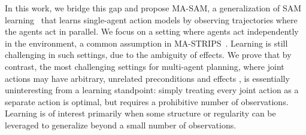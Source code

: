 \documentclass[letterpaper]{article} %
\theoremstyle{definition}
\theoremstyle{remark}
\newcommand{\sam}{\ac{SAM}\xspace}
\newcommand{\masam}{\ac{MA-SAM}\xspace}
\newcommand{\roni}[1]{{\textcolor{red}{[Roni: #1]}}}
\begin{document}


In this work, we bridge this gap and propose \masam, a generalization of \sam learning~ that learns single-agent action models by observing trajectories where the agents act in parallel.
We focus on a setting where agents act independently in the environment, a common assumption in MA-STRIPS~. 
Learning is still challenging in such settings, due to the ambiguity of effects. 
We prove that by contrast, the most challenging settings for multi-agent planning, where joint actions may have arbitrary, unrelated preconditions and effects \cite{boutilier2001partial}, is essentially uninteresting from a learning standpoint: simply treating every joint action as a separate action is optimal, but requires a prohibitive number of observations. Learning is of interest primarily when some structure or regularity can be leveraged to generalize beyond a small number of observations.
\end{document}

